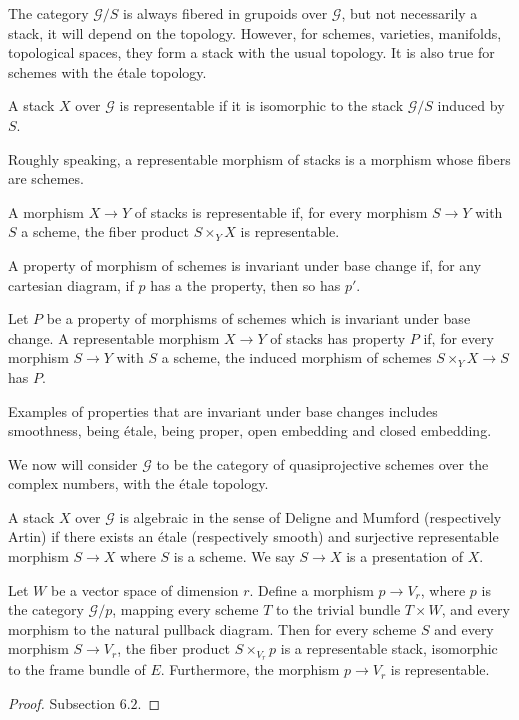 \documentclass[
	oldfontcommands,
	sumario=abnt-6027-2012,
	12pt,			%
	openright,		%
	oneside,		%
	a4paper,		%
	english,		%
	brazil			%
	]{imecc-unicamp}
\begin{document}
The category $\mathcal G/S$ is always fibered in grupoids over $\mathcal G$, but not necessarily a stack, it will depend on the topology. However, for schemes, varieties, manifolds, topological spaces, they form a stack with the usual topology. It is also true for schemes with the \'etale topology.

\begin{definition}
	A stack $X$ over $\mathcal G$ is representable if it is isomorphic to the stack $\mathcal G/S$ induced by $S$.
\end{definition}

Roughly speaking, a representable morphism of stacks is a morphism whose fibers are schemes.

\begin{definition}
	A morphism $X\rightarrow Y$ of stacks is representable if, for every morphism $S\rightarrow Y$ with $S$ a scheme, the fiber product $S\times_Y X$ is representable.
\end{definition}

A property of morphism of schemes is invariant under base change if, for any cartesian diagram, if $p$ has a the property, then so has $p'$.

\begin{definition}
	Let $P$ be a property of morphisms of schemes which is invariant under base change. A representable morphism $X\rightarrow Y$ of stacks has property $P$ if, for every morphism $S\rightarrow Y$ with $S$ a scheme, the induced morphism of schemes $S\times_Y X\rightarrow S$ has $P$.
\end{definition} 

Examples of properties that are invariant under base changes includes smoothness, being \'etale, being proper, open embedding and closed embedding.

We now will consider $\mathcal G$ to be the category of quasiprojective schemes over the complex numbers, with the \'etale topology.

\begin{definition}
	A stack $X$ over $\mathcal G$ is algebraic in the sense of Deligne and Mumford (respectively Artin) if there exists an \'etale (respectively smooth) and surjective representable morphism $S\rightarrow X$ where $S$ is a scheme. We say $S\rightarrow X$ is a presentation of $X$.  
\end{definition}
\begin{lema}
	Let $W$ be a vector space of dimension $r$. Define a morphism $p\rightarrow V_r$, where $p$ is the category $\mathcal G/p$, mapping every scheme $T$ to the trivial bundle $T\times W$, and every morphism to the natural pullback diagram. Then for every scheme $S$ and every morphism $S\rightarrow V_r$, the fiber product $S\times_{V_r}p$ is a representable stack, isomorphic to the frame bundle of $E$. Furthermore, the morphism $p\rightarrow V_r$ is representable.
\end{lema}
\begin{proof}
	\cite{FantechiBarbara} Subsection $6.2$.
\end{proof}
\end{document}
